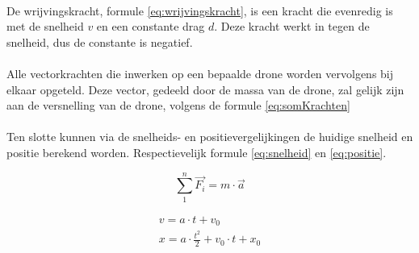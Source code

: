\\
De wrijvingskracht, formule \ref{eq:wrijvingskracht}, is een kracht die evenredig is met de snelheid \(v\) en een constante drag \(d\). Deze kracht werkt in tegen de snelheid, dus de constante is negatief.\\
\\
Alle vectorkrachten die inwerken op een bepaalde drone worden vervolgens bij elkaar opgeteld. Deze vector, gedeeld door de massa van de drone, zal gelijk zijn aan de versnelling van de drone, volgens de formule \ref{eq:somKrachten} \\
\\
Ten slotte kunnen via de snelheids- en positievergelijkingen de huidige snelheid en positie berekend worden. Respectievelijk formule \ref{eq:snelheid} en \ref{eq:positie}. \\

\begin{figure}[h]
	\centering
	\begin{minipage}{.49\textwidth}
		\begin{equation}
		\sum_{1}^{n} \vec{F_i} = m \cdot \vec{a} 
		\label{eq:somKrachten}
		\end{equation}
	\end{minipage}
	\begin{minipage}{.49\textwidth}
		\begin{gather}
		v = a\cdot t + v_0 \label{eq:snelheid}\\
		x = a\cdot \frac{t^{2}}{2} + v_0\cdot t + x_0 \label{eq:positie}
		\end{gather}
	\end{minipage}
\end{figure}

